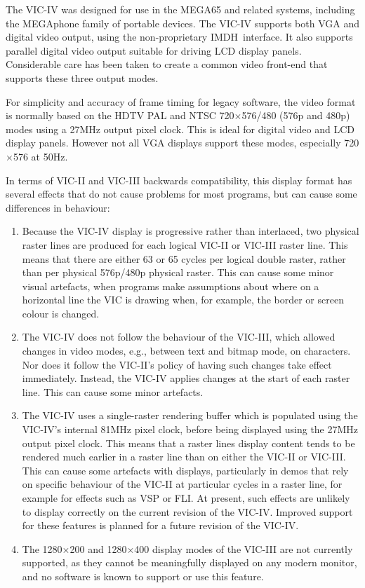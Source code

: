 The VIC-IV was designed for use in the MEGA65 and related systems, including the MEGAphone family of portable devices.
The VIC-IV supports both VGA and digital video output, using the
non-proprietary IMDH\texttrademark \ interface.
It also supports parallel digital video output suitable for driving LCD display
panels.  Considerable care has been taken to create a common video front-end that supports these three output modes.

For simplicity and accuracy of frame timing for legacy software, the video format is normally based on the HDTV PAL and NTSC 720$\times$576/480 (576p and 480p) modes using a 27MHz output pixel clock.  This is ideal for digital video and LCD display panels. However not all VGA displays support
these modes, especially 720$\times$576 at 50Hz.

In terms of VIC-II and VIC-III backwards compatibility, this display format has several effects that do not cause problems for most programs, but can cause some differences in behaviour:

\begin{enumerate}
\item Because the VIC-IV display is progressive rather than interlaced, two physical raster lines are produced for each logical VIC-II or VIC-III raster line.  This means that there are either 63 or 65 cycles per logical double raster, rather than per physical 576p/480p physical raster. This can cause some minor visual artefacts, when programs make assumptions about where on a horizontal line the VIC is drawing when, for example, the border or screen colour is changed.
\item The VIC-IV does not follow the behaviour of the VIC-III, which allowed changes in video modes, e.g., between text and bitmap mode, on characters.  Nor does it follow the VIC-II's policy of having such changes take effect immediately.  Instead, the VIC-IV applies changes at the start of each raster line.  This can cause some minor artefacts.
\item The VIC-IV uses a single-raster rendering buffer which is populated using the VIC-IV's internal 81MHz pixel clock, before being displayed using the 27MHz output pixel clock.  This means that a raster lines display content tends to be rendered much earlier in a raster line than on either the VIC-II or VIC-III.  This can cause some artefacts with displays, particularly in demos that rely on specific behaviour of the VIC-II at particular cycles in a raster line, for example for effects such as VSP or FLI.  At present, such effects are unlikely to display correctly on the current revision of the VIC-IV.  Improved support for these features is planned for a future revision of the VIC-IV.
  \item The 1280$\times$200 and 1280$\times$400 display modes of the VIC-III are not currently supported, as they cannot be meaningfully displayed on any modern monitor, and no software is known to support or use this feature.
\end{enumerate}

